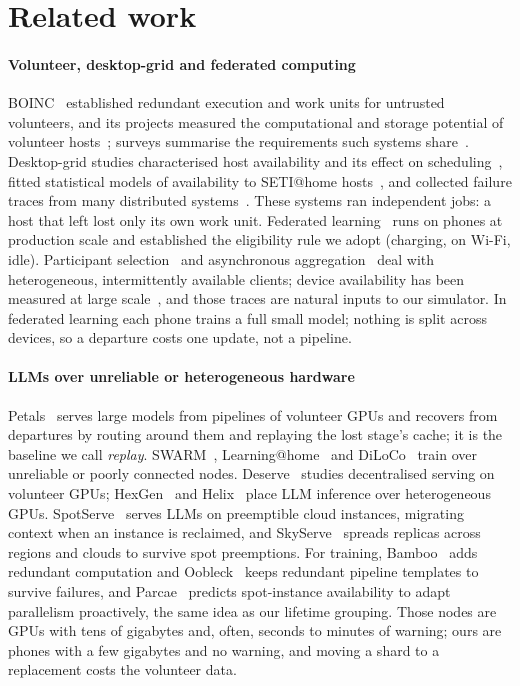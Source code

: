 \documentclass[preprint,review,12pt,authoryear]{elsarticle}
\begin{document}
\section{Related work}
\label{sec:related}

\paragraph{Volunteer, desktop-grid and federated computing}
BOINC~\citep{boinc} established redundant execution and work units for
untrusted volunteers, and its projects measured the computational and storage
potential of volunteer hosts~\citep{anderson2006}; surveys summarise the
requirements such systems share~\citep{durrani2014}. Desktop-grid studies
characterised host availability and its effect on scheduling~\citep{kondo2004},
fitted statistical models of availability to SETI@home
hosts~\citep{javadi2009}, and collected failure traces from many distributed
systems~\citep{fta}. These systems ran independent jobs: a host that left lost
only its own work unit. Federated learning~\citep{fedavg,bonawitz2019,kairouz2021}
runs on phones at production scale and established the eligibility rule we
adopt (charging, on Wi-Fi, idle). Participant selection~\citep{oort} and
asynchronous aggregation~\citep{papaya} deal with heterogeneous, intermittently
available clients; device availability has been measured at large
scale~\citep{yang2021heterogeneity,fedscale}, and those traces are natural
inputs to our simulator. In federated learning each phone trains a full small
model; nothing is split across devices, so a departure costs one update, not a
pipeline.

\paragraph{LLMs over unreliable or heterogeneous hardware}
Petals~\citep{petals-acl,petals-neurips} serves large models from pipelines of
volunteer GPUs and recovers from departures by routing around them and
replaying the lost stage's cache; it is the baseline we call \emph{replay}.
SWARM~\citep{swarm}, Learning@home~\citep{learningathome} and
DiLoCo~\citep{diloco} train over unreliable or poorly connected nodes.
Deserve~\citep{deserve} studies decentralised serving on volunteer GPUs;
HexGen~\citep{hexgen} and Helix~\citep{helix} place LLM inference over
heterogeneous GPUs. SpotServe~\citep{spotserve} serves LLMs on preemptible cloud
instances, migrating context when an instance is reclaimed, and
SkyServe~\citep{skyserve} spreads replicas across regions and clouds to survive
spot preemptions. For training, Bamboo~\citep{bamboo} adds redundant
computation and Oobleck~\citep{oobleck} keeps redundant pipeline templates to
survive failures, and Parcae~\citep{parcae} predicts spot-instance
availability to adapt parallelism proactively, the same idea as our lifetime
grouping. Those nodes are GPUs with tens of gigabytes and, often, seconds to
minutes of warning; ours are phones with a few gigabytes and no warning, and
moving a shard to a replacement costs the volunteer data.
\end{document}
